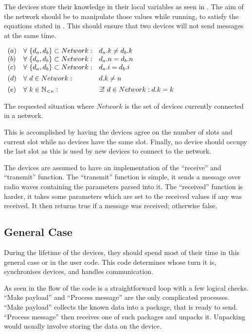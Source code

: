 The devices store their knowledge in their local variables as seen in . 
The aim of the network should be to manipulate those values while running, to satisfy the equations stated in . 
This should ensure that two devices will not send messages at the same time.

\begin{table}[H]
	\centering
	$\begin{array}{l l l}
		(a)&\forall\ \{d_a, d_b\} \subset Network: & d_a.k \neq d_b.k \\
		(b)&\forall\ \{d_a, d_b\} \subset Network: & d_a.n = d_b.n \\
		(c)&\forall\ \{d_a, d_b\} \subset Network: & d_a.i = d_b.i \\[1ex]
		(d)&\forall\ d \in Network: & d.k \neq n \\[1ex]
		(e)&\forall\ k \in \mathbb{N}_{<n}: & \exists!\ d \in Network: d.k = k 
	\end{array}$
	\caption{The requested situation where $Network$ is the set of devices currently connected in a network.}
    \label{tab:invariants}
\end{table}

This is accomplished by having the devices agree on the number of slots and current slot while no devices have the same slot. 
Finally, no device should occupy the last slot as this is used by new devices to connect to the network.

The devices are assumed to have an implementation of the \enquote{receive} and \enquote{transmit} function.
The \enquote{transmit} function is simple, it sends a message over radio waves containing the parameters parsed into it.
The \enquote{received} function is harder, it takes some parameters which are set to the received values if any was received. 
It then returns true if a message was received; otherwise false.
                    
\subsection{General Case} %
\label{sub:general_case}

During the lifetime of the devices, they should spend most of their time in this general case or in the user code. 
This code determines whose turn it is, synchronises devices, and handles communication.

As seen in  the flow of the code is a straightforward loop with a few logical checks. 
\enquote{Make payload} and \enquote{Process message} are the only complicated processes. 
\enquote{Make payload} collects the known data into a package, that is ready to send. 
\enquote{Process message} then receives one of such packages and unpacks it. 
Unpacking would usually involve storing the data on the device.

